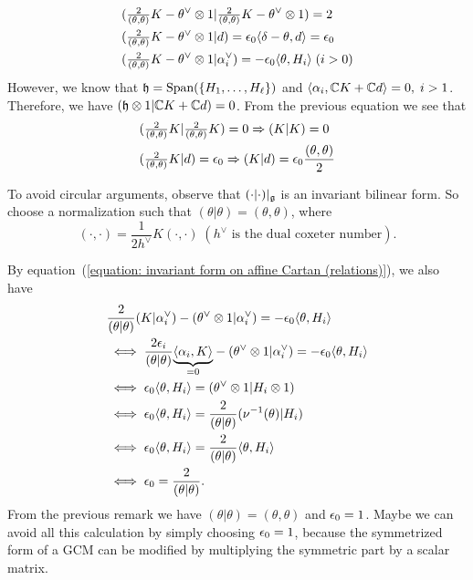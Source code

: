 \begin{itemize}
\begin{equation}
\begin{aligned}
        &(\tfrac{2}{(\theta,\theta)}K-\theta^\vee\otimes1|\tfrac{2}{(\theta,\theta)}K-\theta^\vee\otimes1) =2\\
        &(\tfrac{2}{(\theta,\theta)}K-\theta^\vee\otimes1| d) = \epsilon_0\langle \delta-\theta, d\rangle =\epsilon_0\\
        &(\tfrac{2}{(\theta,\theta)}K-\theta^\vee\otimes1| \alpha^{\vee}_i) = -\epsilon_0\langle\theta,H_i\rangle\;(i>0)
    \end{aligned}
\end{equation}
However, we know that $\mathfrak{h}=\text{Span}(\{H_1,\dots,H_\ell\})$ and $\langle\alpha_i,\mathbb{C} K+\mathbb{C} d\rangle = 0,\;i>1$. Therefore, 
we have $(\mathfrak{h}\otimes1|\mathbb{C} K+\mathbb{C} d)=0$. From the previous equation we see that 
\begin{equation}
    \begin{aligned}
        &(\tfrac{2}{(\theta,\theta)}K|\tfrac{2}{(\theta,\theta)}K) = 0\Rightarrow (K|K) = 0\\
        &(\tfrac{2}{(\theta,\theta)}K|d) = \epsilon_0\Rightarrow (K|d) = \epsilon_0\frac{(\theta,\theta)}{2}
    \end{aligned}
\end{equation}
\begin{remark}
    To avoid circular arguments, observe that $(\cdot|\cdot)|_{\mathfrak{g}}$ is an invariant bilinear form. So choose a normalization 
    such that $(\theta|\theta)=(\theta,\theta)$, where 
    \begin{equation}
        (\cdot,\cdot) = \frac{1}{2h^\vee}K(\cdot,\cdot)\;(h^\vee \text{ is the dual coxeter number}).
    \end{equation}
\end{remark}

By equation~(\ref{equation: invariant form on affine Cartan (relations)}), we also have
\begin{equation}
   \begin{split}
    &\frac{2}{(\theta|\theta)}(K|\alpha^{\vee}_i) - (\theta^\vee\otimes1|\alpha^{\vee}_i) = -\epsilon_0\langle\theta,H_i\rangle\\
    &\iff\frac{2\epsilon_i}{(\theta|\theta)}\underset{=0}{\underbrace{\langle\alpha_i,K\rangle}} - (\theta^\vee\otimes1|\alpha^{\vee}_i) = -\epsilon_0\langle\theta, H_i\rangle\\
    &\iff\epsilon_0\langle\theta,H_i\rangle = (\theta^\vee\otimes1|H_i\otimes1)\\
    &\iff \epsilon_0\langle\theta,H_i\rangle=\frac{2}{(\theta|\theta)}(\nu^{-1}(\theta)|H_i)\\
    &\iff \epsilon_0\langle\theta,H_i\rangle = \frac{2}{(\theta|\theta)}\langle\theta,H_i\rangle\\
    &\iff\epsilon_0 = \frac{2}{(\theta|\theta)}.
   \end{split}
\end{equation}
From the previous remark we have $(\theta|\theta)=(\theta,\theta)$ and $\epsilon_0=1$. Maybe we can avoid all this calculation 
by simply choosing $\epsilon_0=1$, because the symmetrized form of a GCM can be modified by multiplying the symmetric part 
by a scalar matrix.\par 



\end{itemize}
